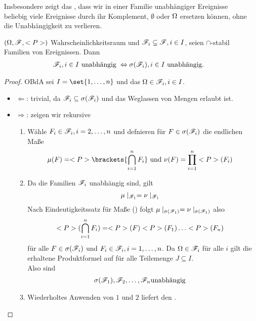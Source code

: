 Insbesondere zeigt das , dass wir in einer Familie unabhängiger Ereignisse beliebig viele Ereignisse durch ihr Komplement, $\emptyset$ oder $\Omega$ ersetzen können, ohne die Unabhängigkeit zu verlieren.
\begin{proposition}
	$(\Omega, \mathscr F, <P>)$ Wahrscheinlichkeitsraum und $\mathscr F_i \subseteq \mathscr F, i \in I$, seien $\cap$-stabil Familien von Ereignissen. Dann
	\begin{align*}
	\mathscr F_i, i \in I \text{ unabhängig } \Leftrightarrow \sigma(\mathscr F_i), i \in I \text{ unabhängig}. 
	\end{align*}
\end{proposition}

\begin{proof}
	OBdA sei $I = \set{1, \dots, n}$ und das $\Omega \in \mathscr F_i, i \in I$.
	\begin{itemize}
		\item $\Leftarrow$: trivial, da $\mathscr F_i \subseteq \sigma(\mathscr F_i)$ und das Weglassen von Mengen erlaubt ist.
		\item $\Rightarrow$: zeigen wir rekursive
		\begin{enumerate}
			\item Wähle $F_i \in \mathscr F_i, i = 2, \dots,n$ und defnieren für $F \in \sigma(\mathscr F_i)$ die endlichen Maße
			\begin{align*}
			\mu(F) = \P\brackets{\bigcap_{i=1}^n F_i} \und \nu(F) = \prod_{i=1}^n \P(F_i)
			\end{align*}
			\item Da die Familien $\mathscr F_i$ unabhängig sind, gilt
			\begin{align*}
			\mu\mid_{\mathscr F_1} = \nu\mid_{\mathscr F_1}
			\end{align*}
			Nach Eindeutigkeitssatz für Maße () folgt $\mu\mid_{\sigma(\mathscr F_1)} = \nu\mid_{\sigma(\mathscr F_1)}$ also
			\begin{align*}
			\P(\bigcap_{i=1}^n F_i) = \P(F)\P(F_1)\dots \P(F_n)
			\end{align*}
			für alle $F \in \sigma(\mathscr F_i)$ und $F_i \in \mathscr F_i, i = 1, \dots, n$. Da $\Omega \in \mathscr F_i$ für alle $i$ gilt die erhaltene Produktformel auf für alle Teilemenge $J \subseteq I$.\\
			Also sind
			\begin{align*}
			\sigma(\mathscr F_1), \mathscr F_2, \dots, \mathscr F_n \text{unabhängig}
			\end{align*}
			\item Wiederholtes Anwenden von $1$ und $2$ liefert den .
		\end{enumerate}
	\end{itemize}
\end{proof}

